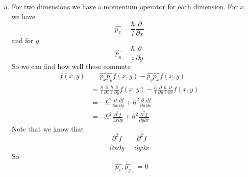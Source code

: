 \documentclass[11pt]{article}
\numberwithin{equation}{section}
\begin{document}
\begin{enumerate}[(a)]
\item
For two dimensions we have a momentum operator for each dimension. For $x$ we have
$$\hat{p_x} = \frac{\hbar}{i}\frac{\partial}{\partial x}$$
and for $y$
$$\hat{p_y} = \frac{\hbar}{i}\frac{\partial}{\partial y}$$
So we can find how well these commute 
\begin{align*}
[\hat{p_x},\hat{p_y}]f(x,y) &= \hat{p_x}\hat{p_y}f(x,y) - \hat{p_y}\hat{p_x}f(x,y)\\
&=  \frac{\hbar}{i}\frac{\partial}{\partial x}\frac{\hbar}{i}\frac{\partial}{\partial y}f(x,y) - \frac{\hbar}{i}\frac{\partial}{\partial y}\frac{\hbar}{i}\frac{\partial}{\partial x}f(x,y)\\ 
&=  -\hbar^2\frac{\partial}{\partial x}\frac{\partial f}{\partial y} + \hbar^2\frac{\partial}{\partial y}\frac{\partial f}{\partial x}\\
&=  -\hbar^2\frac{\partial^2 f}{\partial x\partial y} + \hbar^2\frac{\partial^2 f}{\partial y\partial x}
\end{align*}
Note that we know that 
$$\frac{\partial^2 f}{\partial x\partial y} = \frac{\partial^2 f}{\partial y\partial x}$$
So 
$$[\hat{p_x},\hat{p_y}] = 0$$
\end{enumerate}
\end{document}
